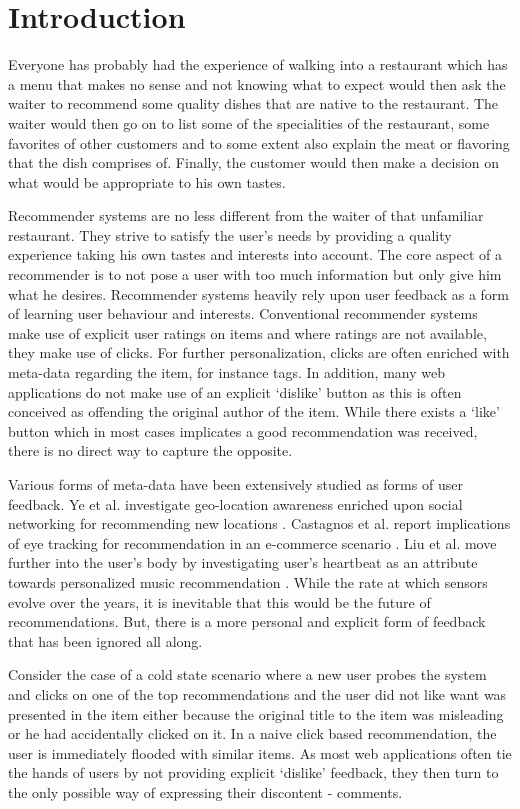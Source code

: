 \chapter{Introduction}
Everyone has probably had the experience of walking into a restaurant which has a menu that makes no sense and not knowing what to expect would then ask the waiter to recommend some quality dishes that are native to the restaurant. The waiter would then go on to list some of the specialities of the restaurant, some favorites of other customers and to some extent also explain the  meat or flavoring that the dish comprises of. Finally, the customer would then make a decision on what would be appropriate to his own tastes.

Recommender systems are no less different from the waiter of that unfamiliar restaurant. They strive to satisfy the user's needs by providing a quality experience taking his own tastes and interests into account. The core aspect of a recommender is to not pose a user with too much information but only give him what he desires. Recommender systems heavily rely upon user feedback as a form of learning user behaviour and interests. Conventional recommender systems make use of explicit user ratings on items and where ratings are not available, they make use of clicks. For further personalization, clicks are often enriched with meta-data regarding the item, for instance tags. In addition, many web applications do not make use of an explicit `dislike' button as this is often conceived as offending the original author of the item. While there exists a `like' button which in most cases implicates a good recommendation was received, there is no direct way to capture the opposite.

Various forms of meta-data have been extensively studied as forms of user feedback. Ye et al. investigate geo-location awareness enriched upon social networking for recommending new locations \cite{ye_location_2010}.  Castagnos et al. report implications of eye tracking for recommendation in an e-commerce scenario \cite{castagnos_eye-tracking_2010}. Liu et al. move further into the user's body by investigating user's heartbeat as an attribute towards personalized music recommendation \cite{liu_music_2009}. While the rate at which sensors evolve over the years, it is inevitable that this would be the future of recommendations. But, there is a more personal and explicit form of feedback that has been ignored all along. 

Consider the case of a cold state scenario where a new user probes the system and clicks on one of the top recommendations and the user did not like want was presented in the item either because the original title to the item was misleading or he had accidentally clicked on it. In a naive click based recommendation, the user is immediately flooded with similar items. As most web applications often tie the hands of users by not providing explicit `dislike' feedback, they then turn to the only possible way of expressing 
their discontent - comments.

